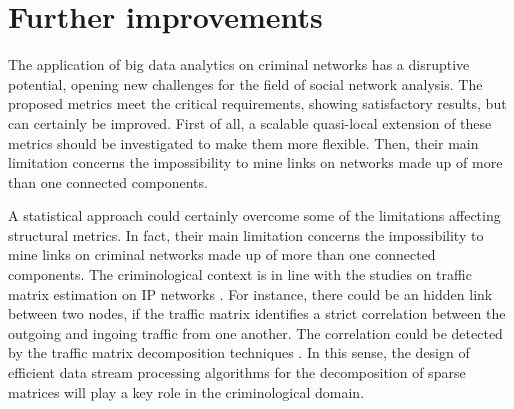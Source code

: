 \section{Further improvements}
\label{sec:further-improvements}

The application of big data analytics on criminal networks has a disruptive potential, opening new challenges for the field of social network analysis.
The proposed metrics meet the critical requirements, showing satisfactory results, but can certainly be improved. 
First of all, a scalable quasi-local extension of these metrics should be investigated to make them more flexible.
Then, their main limitation concerns the impossibility to mine links on networks made up of more than one connected components. 

A statistical approach could certainly overcome some of the limitations affecting structural metrics. In fact, their main limitation concerns the impossibility to mine links on criminal networks made up of more than one connected components.  
The criminological context is in line with the studies on traffic matrix estimation on IP networks  \cite{papagiannaki2004distributed}. 
For instance, there could be an hidden link between two nodes, if the traffic matrix identifies a strict correlation between the outgoing and ingoing traffic from one another. 
The correlation could be detected by the traffic matrix decomposition techniques \cite{elgamal2015analysis}. 
In this sense, the design of efficient data stream processing algorithms for the decomposition of sparse matrices will play a key role in the criminological domain.